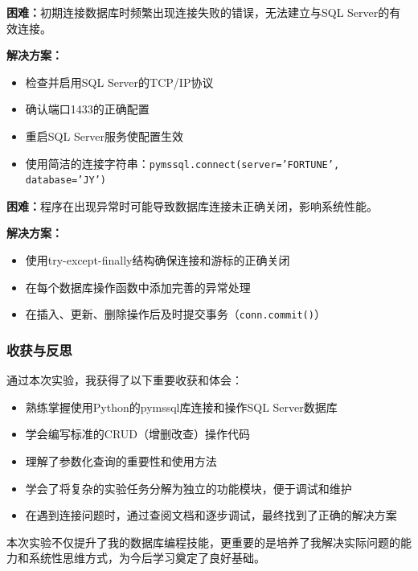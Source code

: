 \documentclass[a4paper]{article}
\begin{document}
\textbf{困难：}初期连接数据库时频繁出现连接失败的错误，无法建立与SQL Server的有效连接。

\textbf{解决方案：}
\begin{itemize}
    \item 检查并启用SQL Server的TCP/IP协议
    \item 确认端口1433的正确配置
    \item 重启SQL Server服务使配置生效
    \item 使用简洁的连接字符串：\texttt{pymssql.connect(server='FORTUNE', database='JY')}
\end{itemize}

\textbf{困难：}程序在出现异常时可能导致数据库连接未正确关闭，影响系统性能。

\textbf{解决方案：}
\begin{itemize}
    \item 使用try-except-finally结构确保连接和游标的正确关闭
    \item 在每个数据库操作函数中添加完善的异常处理
    \item 在插入、更新、删除操作后及时提交事务（\texttt{conn.commit()}）
\end{itemize}

\subsubsection{收获与反思}

通过本次实验，我获得了以下重要收获和体会：
\begin{itemize}
    \item 熟练掌握使用Python的pymssql库连接和操作SQL Server数据库
    \item 学会编写标准的CRUD（增删改查）操作代码
    \item 理解了参数化查询的重要性和使用方法
    \item 学会了将复杂的实验任务分解为独立的功能模块，便于调试和维护
    \item 在遇到连接问题时，通过查阅文档和逐步调试，最终找到了正确的解决方案
\end{itemize}

本次实验不仅提升了我的数据库编程技能，更重要的是培养了我解决实际问题的能力和系统性思维方式，为今后学习奠定了良好基础。
\end{document}
